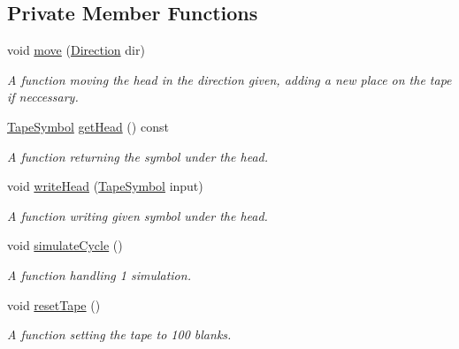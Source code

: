 \subsection*{\-Private \-Member \-Functions}
\begin{DoxyCompactItemize}
\item 
void \hyperlink{classTM_1_1TuringMachine_a0aa707581497a4a7a0da06eb2ed867be}{move} (\hyperlink{namespaceTM_a7c40dddb5b66504639e0d378ec13792d}{\-Direction} dir)
\begin{DoxyCompactList}\small\item\em \-A function moving the head in the direction given, adding a new place on the tape if neccessary. \end{DoxyCompactList}\item 
\hyperlink{classTM_1_1TapeSymbol}{\-Tape\-Symbol} \hyperlink{classTM_1_1TuringMachine_aa3a5267e700842786eeb59fa96a3007f}{get\-Head} () const 
\begin{DoxyCompactList}\small\item\em \-A function returning the symbol under the head. \end{DoxyCompactList}\item 
void \hyperlink{classTM_1_1TuringMachine_a63ec43241d2c34c3c19de91cdac7a2b6}{write\-Head} (\hyperlink{classTM_1_1TapeSymbol}{\-Tape\-Symbol} input)
\begin{DoxyCompactList}\small\item\em \-A function writing given symbol under the head. \end{DoxyCompactList}\item 
void \hyperlink{classTM_1_1TuringMachine_a4b31360cb25c328eaef5c5a6aee484b2}{simulate\-Cycle} ()
\begin{DoxyCompactList}\small\item\em \-A function handling 1 simulation. \end{DoxyCompactList}\item 
void \hyperlink{classTM_1_1TuringMachine_aef5eb3b9f3c3c3b1b1f499cc45480976}{reset\-Tape} ()
\begin{DoxyCompactList}\small\item\em \-A function setting the tape to 100 blanks. \end{DoxyCompactList}\end{DoxyCompactItemize}

